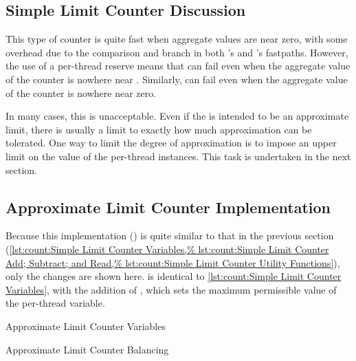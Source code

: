 \subsection{Simple Limit Counter Discussion}
\label{sec:count:Simple Limit Counter Discussion}

This type of counter is quite fast when aggregate values are near zero,
with some overhead due to the comparison and branch in both
's and 's fastpaths.
However, the use of a per-thread  reserve means that
 can fail even when
the aggregate value of the counter is nowhere near .
Similarly,  can fail
even when the aggregate value of the counter is nowhere near zero.

In many cases, this is unacceptable.
Even if the  is intended to be an approximate limit,
there is usually a limit to exactly how much approximation can be tolerated.
One way to limit the degree of approximation is to impose an upper limit
on the value of the per-thread  instances.
This task is undertaken in the next section.

\subsection{Approximate Limit Counter Implementation}
\label{sec:count:Approximate Limit Counter Implementation}

Because this implementation () is quite similar to
that in the previous section
(\cref{lst:count:Simple Limit Counter Variables,%
lst:count:Simple Limit Counter Add; Subtract; and Read,%
lst:count:Simple Limit Counter Utility Functions}),
only the changes are shown here.
is identical to
\cref{lst:count:Simple Limit Counter Variables},
with the addition of , which sets the maximum
permissible value of the per-thread  variable.

\begin{listing}[tbp]

\caption{Approximate Limit Counter Variables}
\label{lst:count:Approximate Limit Counter Variables}
\end{listing}

\begin{listing}[tbp]

\caption{Approximate Limit Counter Balancing}
\label{lst:count:Approximate Limit Counter Balancing}
\end{listing}

